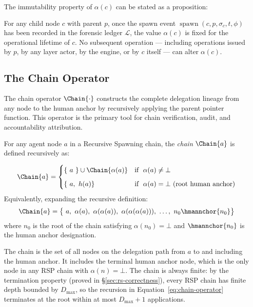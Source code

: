 The immutability property of $\alpha(c)$ can be stated as a proposition:

\begin{prop}
\label{prop:parent-pointer-immutable}
For any child node $c$ with parent $p$, once the spawn event $\operatorname{spawn}(c, p, \sigma_c, t, \phi)$ has been recorded in the forensic ledger $\mathcal{L}$, the value $\alpha(c)$ is fixed for the operational lifetime of $c$. No subsequent operation --- including operations issued by $p$, by any \purpose{} layer actor, by the \bounds{} engine, or by $c$ itself --- can alter $\alpha(c)$.
\end{prop}

\subsection{The Chain Operator}
\label{sec:chain-operator}

The chain operator $\Chain{\cdot}$ constructs the complete delegation lineage from any node to the human anchor by recursively applying the parent pointer function. This operator is the primary tool for chain verification, audit, and accountability attribution.

\begin{dfn}
\label{def:chain-operator}
For any agent node $a$ in a Recursive Spawning chain, the \emph{chain} $\Chain{a}$ is defined recursively as:

\begin{equation}
\Chain{a} =
\begin{cases}
\{\ a\ \} \cup \Chain{\alpha(a)} & \text{if }\ \alpha(a) \neq \bot \\[6pt]
\{\ a,\ h(a) \} & \text{if }\ \alpha(a) = \bot\ \text{(root human anchor)}
\end{cases}
\label{eq:chain-operator}
\end{equation}
Equivalently, expanding the recursive definition:
\begin{equation}
\Chain{a} = \bigl\{\ a,\ \alpha(a),\ \alpha(\alpha(a)),\ \alpha(\alpha(\alpha(a))),\ \ldots,\ n_0 \hmannchor{n_0} \bigr\}
\label{eq:chain-expanded}
\end{equation}
where $n_0$ is the root of the chain satisfying $\alpha(n_0) = \bot$ and $\hmannchor{n_0}$ is the human anchor designation.
\end{dfn}

The chain is the set of all nodes on the delegation path from $a$ to and including the human anchor. It includes the terminal human anchor node, which is the only node in any RSP chain with $\alpha(n) = \bot$. The chain is always finite: by the termination property (proved in \S\ref{sec:rs-correctness}), every RSP chain has finite depth bounded by $D_{\max}$, so the recursion in Equation~\ref{eq:chain-operator} terminates at the root within at most $D_{\max} + 1$ applications.

